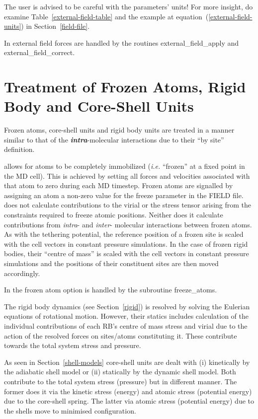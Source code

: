 The user is advised to be careful with the parameters' units!  For more
insight, do examine Table~\ref{external-field-table} and the example at
equation~(\ref{external-field-units}) in Section~\ref{field-file}.

In \D external field forces are
handled by the routines {\sc external\_field\_apply} and \\ \noindent
{\sc external\_field\_correct}.

\section{Treatment of Frozen Atoms, Rigid Body and Core-Shell Units}

Frozen atoms, core-shell units and rigid body units are treated in a
manner similar to that of the {\em \bf intra}-molecular interactions due to
their ``by site'' definition.

\D allows for atoms to be completely immobilized ({\em i.e.}
``frozen'' at a fixed point in the MD cell).  This is achieved by
setting all forces and velocities associated with that atom to
zero during each MD timestep.  Frozen atoms are signalled by
assigning an atom a non-zero value for the freeze parameter in the
FIELD file.  \D does not calculate contributions to the virial or
the stress tensor arising from the
constraints required to freeze atomic positions.  Neither does it
calculate contributions from {\em intra}- and {\em inter}- molecular
interactions between frozen atoms.  As with the tethering
potential, the reference position of a frozen site is scaled with
the cell vectors in constant pressure simulations.  In the case of
frozen rigid bodies, their ``centre of mass'' is scaled with
the cell vectors in constant pressure simulations and the positions
of their constituent sites are then moved accordingly.

In \D the frozen atom option is handled by the subroutine {\sc freeze\_atoms}.

The rigid body dynamics (see Section~\ref{rigid}) is resolved by
solving the Eulerian equations of rotational motion.
However, their statics includes calculation of the individual
contributions of each RB's centre of mass stress and virial
due to the action of the resolved forces on sites/atoms constituting it.
These contribute towards the total system stress and pressure.

As seen in Section~\ref{shell-models} core-shell units
are dealt with (i) kinetically by the adiabatic shell model or (ii)
statically by the dynamic shell model.  Both contribute to the total
system stress (pressure) but in different manner.  The former does
it via the kinetic stress (energy) and atomic stress (potential
energy) due to the core-shell spring.  The latter via atomic stress (potential
energy) due to the shells move to minimised configuration.

